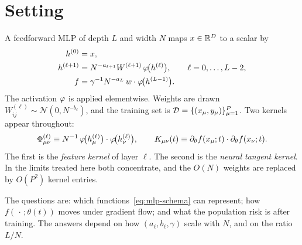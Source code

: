 \section{Setting}

A feedforward MLP of depth $L$ and width $N$ maps $x\in\mathbb{R}^{D}$ to a scalar by
\begin{align}
  h^{(0)} &= x, \nonumber\\
  h^{(\ell+1)} &= N^{-a_{\ell+1}} W^{(\ell+1)}\,\varphi\!\big(h^{(\ell)}\big),
  \qquad \ell=0,\ldots,L-2, \nonumber\\
  f &= \gamma^{-1} N^{-a_L}\, w\cdot\varphi\!\big(h^{(L-1)}\big).
  \label{eq:mlp-schema}
\end{align}
The activation $\varphi$ is applied elementwise. Weights are drawn $W^{(\ell)}_{ij}\sim\mathcal{N}(0,N^{-b_\ell})$, and the training set is $\mathcal{D}=\{(x_\mu,y_\mu)\}_{\mu=1}^{P}$. Two kernels appear throughout:
\begin{equation}
  \Phi^{(\ell)}_{\mu\nu}
  \equiv
  N^{-1}\,\varphi\!\big(h^{(\ell)}_\mu\big)\cdot\varphi\!\big(h^{(\ell)}_\nu\big),
  \qquad
  K_{\mu\nu}(t)
  \equiv
  \partial_\theta f(x_\mu;t)\cdot\partial_\theta f(x_\nu;t).
  \label{eq:two-kernels}
\end{equation}
The first is the \emph{feature kernel} of layer $\ell$. The second is the \emph{neural tangent kernel}. In the limits treated here both concentrate, and the $O(N)$ weights are replaced by $O(P^2)$ kernel entries.

The questions are: which functions~\eqref{eq:mlp-schema} can represent; how $f(\,\cdot\,;\theta(t))$ moves under gradient flow; and what the population risk is after training. The answers depend on how $(a_\ell,b_\ell,\gamma)$ scale with $N$, and on the ratio $L/N$.
